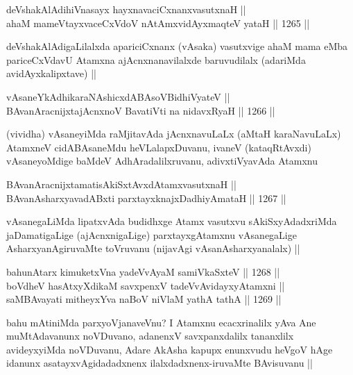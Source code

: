 \begin{shl}
deVshakAlAdihiVnasayx hayxnavaciCxnanxvasutxnaH || \\
ahaM mameVtayxvaceCxVdoV nA\s \s tAmxvidAyxmaqteV yataH ||  1265 ||  
\end{shl}

\begin{artha}
deVshakAlAdigaLilalxda apariciCxnanx (vAsaka) vasutxvige ahaM mama eMba pariceCxVdavU Atamxna ajAcnxnanavilalxde baruvudilalx (adariMda avidAyxkalipxtave) ||
\end{artha}

\begin{shl}
vAsaneYkAdhikaraNAshicxdABAsoV\s BidhiVyateV || \\
BAvanAracnijxtajAcnxnoV BavatiVti na nidavxRyaH ||  1266 ||  
\end{shl}

\begin{artha}
(vividha) vAsaneyiMda raMjitavAda jAcnxnavuLaLx (aMtaH karaNavuLaLx) AtamxneV cidABAsaneMdu heVLalapxDuvanu, ivaneV (kataqRtAvxdi) vAsaneyoMdige baMdeV AdhAradalilxruvanu, adivxtiVyavAda Atamxnu
\end{artha}


\begin{shl}
BAvanAracnijxtamatisAkiSxtAvxdAtamxvasutxnaH || \\
BAvanAsharxyavadABxti parxtayxknajxDadhiyAmataH ||  1267 ||  
\end{shl}

\begin{artha}
vAsanegaLiMda lipatxvAda budidhxge Atamx vasutxvu sAkiSxyAdadxriMda jaDamatigaLige (ajAcnxnigaLige) parxtayxgAtamxnu vAsanegaLige AsharxyanAgiruvaMte toVruvanu (nijavAgi vAsanAsharxyanalalx) ||
\end{artha}


\begin{shl}
bahunA\s tarx kimuketxVna yadeVvAyaM samiVkaSxteV ||  1268 ||  \\
boVdheV hasAtxyXdikaM savxpenxV tadeVvAvidayxyA\s \s tamxni ||  \\
saMBAvayati mitheyxYva naBoV niVlaM yathA tathA ||  1269 ||  
\end{shl}

\begin{artha}
bahu mAtiniMda parxyoVjanaveVnu? I Atamxnu ecacxrinalilx yAva Ane muMtAdavanunx noVDuvano, adanenxV savxpanxdalilx tananxlilx avideyxyiMda noVDuvanu, Adare AkAsha kapupx enunxvudu heVgoV hAge idanunx asatayxvAgidadadxnenx ilalxdadxnenx-iruvaMte BAvisuvanu ||
\end{artha}

